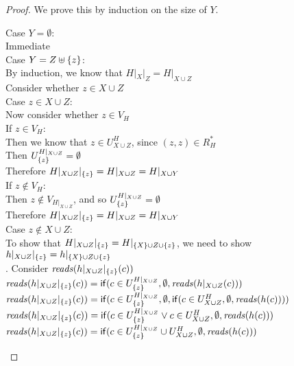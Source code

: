 \begin{proof}
We prove this by induction on the size of $Y$. 
\begin{tabbedproof}
\oo Case $Y = \emptyset$: \\
\ooo Immediate \\
\oo Case $Y = Z \uplus \{{z}\}$: \\
\ooo By induction, we know that $H|_X|_Z = H|_{X \cup Z}$ \\
\ooo Consider whether $z \in X \cup Z$ \\
\ooo Case $z \in X \cup Z$: \\
\oooo Now consider whether $z \in V_H$ \\
\oooo If $z \in V_H$:\\
\ooooo Then we know that $z \in U^H_{X \cup Z}$, since $(z, z) \in R^\ast_H$ \\
\ooooo Then $U^{H|_{X \cup Z}}_{\{{z}\}} = \emptyset$ \\
\ooooo Therefore $H|_{X \cup Z}|_{\{{z}\}} = H|_{X \cup Z} = H|_{X \cup Y}$  \\ 
\oooo If $z \not\in V_H$: \\
\ooooo Then $z \not\in V_{H|_{X \cup Z}}$, and so $U^{H|_{X \cup Z}}_{\{{z}\}} = \emptyset$ \\
\ooooo Therefore $H|_{X \cup Z}|_{\{{z}\}} = H|_{X \cup Z} = H|_{X \cup Y}$  \\ 
\ooo Case $z \not\in X \cup Z$: \\
\oooo To show that $H|_{X \cup Z}|_{\{{z}\}} = H|_{\{{X}\} \cup Z \cup \{{z}\}} $, we need to show $h|_{X \cup Z}|_{\{{z}\}} = h|_{\{{X}\} \cup Z \cup \{{z}\}}$ \\
. Consider $\mathit{reads}(h|_{X \cup Z}|_{\{{z}\}}(c))$ \\
\ooooo $\mathit{reads}(h|_{X \cup Z}|_{\{{z}\}}(c)) = \mathsf{if}({c \in U^{H|_{X \cup Z}}_{\{{z}\}}}, {\emptyset}, {\mathit{reads}(h|_{X \cup Z}(c))})$ \\
\ooooo $\mathit{reads}(h|_{X \cup Z}|_{\{{z}\}}(c)) = \mathsf{if}({c \in U^{H|_{X \cup Z}}_{\{{z}\}}}, {\emptyset}, {\mathsf{if}({c \in U^H_{X \cup Z}}, {\emptyset}, {\mathit{reads}(h(c))})})$ \\
\ooooo $\mathit{reads}(h|_{X \cup Z}|_{\{{z}\}}(c)) = \mathsf{if}({c \in U^{H|_{X \cup Z}}_{\{{z}\}} \vee c \in U^H_{X \cup Z}}, {\emptyset}, {\mathit{reads}(h(c))})$ \\
\ooooo $\mathit{reads}(h|_{X \cup Z}|_{\{{z}\}}(c)) = \mathsf{if}({c \in U^{H|_{X \cup Z}}_{\{{z}\}} \cup U^H_{X \cup Z}}, {\emptyset}, {\mathit{reads}(h(c))})$ \\

\end{tabbedproof}
\end{proof}

